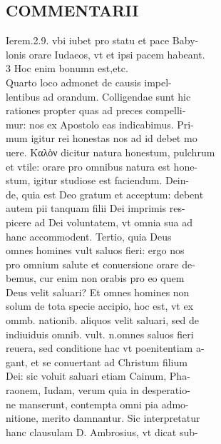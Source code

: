 \documentclass{article}
\begin{document}
\begin{pages}
\section*{COMMENTARII \\
                }
Ierem.2.9. vbi iubet pro statu et pace Baby- \\
                lonis orare Iudaeos, vt et ipsi pacem habeant. \\
                3 Hoc enim bonumn est,etc. \\
                Quarto loco admonet de causis impel- \\
                lentibus ad orandum. Colligendae sunt hic \\
                rationes propter quas ad preces compelli- \\
                mur: nos ex Apostolo eas indicabimus. Pri- \\
                mum igitur rei honestas nos ad id debet mo \\
                uere. Καλὸν dicitur natura honestum, pulchrum \\
                et vtile: orare pro omnibus natura est hone- \\
                stum, igitur studiose est faciendum. Dein- \\
                de, quia est Deo gratum et acceptum: debent \\
                autem pii tanquam filii Dei imprimis res- \\
                picere ad Dei voluntatem, vt omnia sua ad \\
                hanc accommodent. Tertio, quia Deus \\
                omnes homines vult saluos fieri: ergo nos \\
                pro omnium salute et conuersione orare de- \\
                bemus, cur enim non orabis pro eo quem \\
                Deus velit saluari? Et omnes homines non \\
                solum de tota specie accipio, hoc est, vt ex \\
                ommb. nationib. aliquos velit saluari, sed de \\
                indiuiduis omnib. vult. n.omnes saluos fieri \\
                reuera, sed conditione hac vt poenitentiam a- \\
                gant, et se conuertant ad Christum filium \\
                Dei: sic voluit saluari etiam Cainum, Pha- \\
                raonem, Iudam, verum quia in desperatio- \\
                ne manserunt, contempta omni pia admo- \\
                nitione, merito damnantur. Sic interpretatur \\
                hanc clausulam D. Ambrosius, vt dicat sub- \\
                

\end{pages}
\end{document}
